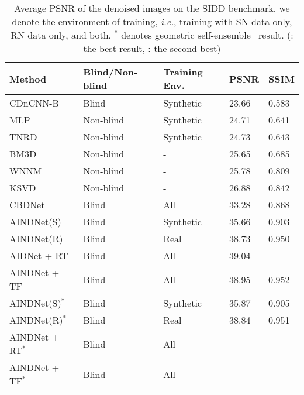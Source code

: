 \documentclass[10pt,twocolumn,letterpaper]{article}
\begin{document}
\begin{table}[t]
	\centering
	\caption{Average PSNR of the denoised images on the SIDD benchmark, we denote the environment of training, {\em i.e.}, training with SN data only, RN data only, and both. $^*$ denotes geometric self-ensemble~\cite{timofte2016seven} result. (\color{red}{red}: \color{black} the best result, \color{blue}{blue}: \color{black} the second best)}
	\label{talbe:SIDD}
	\begin{adjustbox}{width=0.88\linewidth}
		\begin{tabular}{lllll}
			\toprule			
			Method & Blind/Non-blind   & Training Env.   & PSNR & SSIM  \\
			\midrule
			CDnCNN-B~\cite{zhang2017beyond}         & Blind 	 & Synthetic  & 23.66      & 0.583      \\		
			MLP~\cite{burger2012image}         	 & Non-blind & Synthetic  & 24.71  	  & 0.641      \\	
			TNRD~\cite{chen2016trainable}         	 & Non-blind & Synthetic  & 24.73      & 0.643      \\	
			BM3D~\cite{dabov2007color}         	 & Non-blind & -  & 25.65  	  & 0.685      \\			
			WNNM~\cite{gu2014weighted}         	 & Non-blind & -  & 25.78  	  & 0.809      \\			
			KSVD~\cite{aharon2006k}         	 & Non-blind & -  & 26.88  	  & 0.842      \\				
			CBDNet~\cite{guo2019toward}   	 & Blind 	 & All  & 33.28  	  & 0.868      \\			
			\midrule
			AINDNet(S) 	    	& Blind 	 & Synthetic  & 35.66  	  & 0.903      \\	
			AINDNet(R) 			& Blind 	 & Real  & 38.73  	  & 0.950		\\
			AIDNet + RT	 		& Blind 	 & All  & 39.04  	  & \color{red}{0.955}		\\
			AINDNet + TF		& Blind 	 & All  & 38.95  	  & 0.952 		\\
			\midrule
			AINDNet(S)$^*$ 	    	 & Blind 	 & Synthetic  & 35.87  	  & 0.905 \\
			AINDNet(R)$^*$	    	 & Blind 	 & Real  & 38.84  	  & 0.951 \\
			AINDNet + RT$^*$ 			 & Blind 	 & All  & \color{red}{39.15}  	  & \color{red}{0.955} \\
			AINDNet + TF$^*$ 	    	 & Blind 	 & All  & \color{blue}{39.08}  	  & \color{blue}{0.953} \\
			\bottomrule						
		\end{tabular}
	\end{adjustbox}
\end{table}
\end{document}
